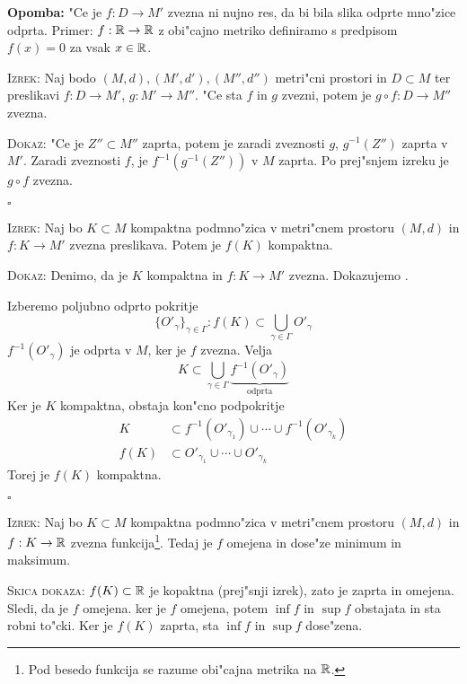 \textbf{Opomba:} "Ce je $f: D \to M'$ zvezna ni nujno res, da bi bila slika odprte mno"zice odprta. Primer: $f: \mathbb{R} \to \mathbb{R}$ z obi"cajno metriko definiramo s predpisom $f(x) = 0$ za vsak $x \in \mathbb{R}$.

\textsc{Izrek:} Naj bodo $(M, d), (M', d'), (M'', d'')$ metri"cni prostori in $D \subset M$ ter preslikavi $f: D \to M'$, $g: M' \to M''$. "Ce sta $f$ in $g$ zvezni, potem je $g \circ f: D \to M''$ zvezna.

\textsc{Dokaz:} "Ce je $Z'' \subset M''$ zaprta, potem je zaradi zveznosti $g$, $g^{-1}(Z'')$ zaprta v $M'$. Zaradi zveznosti $f$, je $f^{-1}(g^{-1}(Z''))$ v $M$ zaprta. Po prej"snjem izreku je $g \circ f$ zvezna.

\hfill $\square$

\textsc{Izrek:} Naj bo $K \subset M$ kompaktna podmno"zica v metri"cnem prostoru $(M, d)$ in $f: K \to M'$ zvezna preslikava. Potem je $f(K)$ kompaktna.

\textsc{Dokaz:} Denimo, da je $K$ kompaktna in $f: K \to M'$ zvezna. Dokazujemo .

Izberemo poljubno odprto pokritje 
\begin{equation*}
\{ O'_\gamma \}_{\gamma \in \Gamma}: f(K) \subset \bigcup_{\gamma \in \Gamma} O'_\gamma
\end{equation*}
$f^{-1}(O'_\gamma)$ je odprta v $M$, ker je $f$ zvezna. Velja
\begin{equation*}
K \subset \bigcup_{\gamma \in \Gamma} \underbrace{f^{-1}(O'_\gamma)}_\text{odprta}
\end{equation*}
Ker je $K$ kompaktna, obstaja kon"cno podpokritje
\begin{align*}
K &\subset f^{-1}(O'_{\gamma_1}) \cup \cdots \cup f^{-1}(O'_{\gamma_k}) \\
f(K) &\subset O'_{\gamma_1} \cup \cdots \cup O'_{\gamma_k}
\end{align*}
Torej je $f(K)$ kompaktna.

\hfill $\square$

\textsc{Izrek:} Naj bo $K \subset M$ kompaktna podmno"zica v metri"cnem prostoru $(M, d)$ in $f: K \to \mathbb{R}$ zvezna funkcija\footnote{Pod besedo funkcija se razume obi"cajna metrika na $\mathbb{R}$.}. Tedaj je $f$ omejena in dose"ze minimum in maksimum.

\textsc{Skica dokaza:} $f(K) \subset \mathbb{R}$ je kopaktna (prej"snji izrek), zato je zaprta in omejena. Sledi, da je $f$  omejena. ker je $f$ omejena, potem $\inf f$ in $\sup f$ obstajata in sta robni to"cki. Ker je $f(K)$ zaprta, sta $\inf f$ in $\sup f$ dose"zena.

